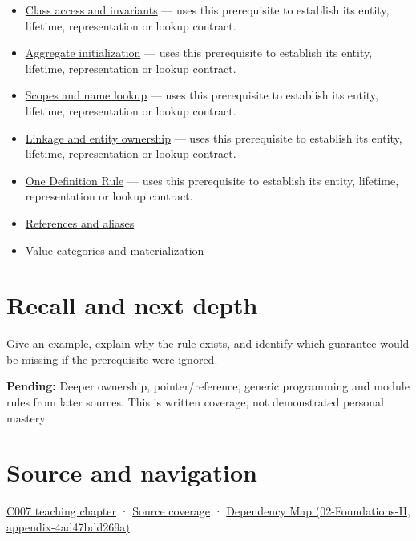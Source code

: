 \begin{itemize}
\tightlist
\item
  \hyperref[appendix-8e5214819615]{Class access and invariants} --- uses this prerequisite to establish its entity, lifetime, representation or lookup contract.
\item
  \hyperref[appendix-b7174c179542]{Aggregate initialization} --- uses this prerequisite to establish its entity, lifetime, representation or lookup contract.
\item
  \hyperref[appendix-b12b31759da1]{Scopes and name lookup} --- uses this prerequisite to establish its entity, lifetime, representation or lookup contract.
\item
  \hyperref[appendix-74a0ec818c18]{Linkage and entity ownership} --- uses this prerequisite to establish its entity, lifetime, representation or lookup contract.
\item
  \hyperref[appendix-49d27bc9d9a5]{One Definition Rule} --- uses this prerequisite to establish its entity, lifetime, representation or lookup contract.
\item
  \hyperref[appendix-d6d562ca9fbb]{References and aliases}
\item
  \hyperref[appendix-1121b30eaeb0]{Value categories and materialization}
\end{itemize}

\section{Recall and next depth}\label{appendix-2e4d494c2d94-recall-and-next-depth}

Give an example, explain why the rule exists, and identify which guarantee would be missing if the prerequisite were ignored.

\textbf{Pending:} Deeper ownership, pointer/reference, generic programming and module rules from later sources. This is written coverage, not demonstrated personal mastery.

\section{Source and navigation}\label{appendix-2e4d494c2d94-source-and-navigation}

\href{Continuous\%20Notes/Computing\%20Foundations\%20-\%20From\%20Bits\%20to\%20C++\%20and\%20Systems\%20APIs\#Promises\%20become\%20definitions}{C007 teaching chapter} · \hyperref[appendix-fd090d982a15-m007---parts-101-112]{Source coverage} · \href{../02-Foundations-II/main.pdf\#nameddest=appendix-4ad47bdd269a}{Dependency Map (02-Foundations-II, appendix-4ad47bdd269a)}
